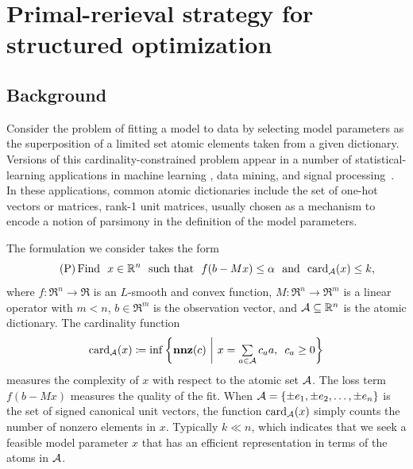 \chapter{Primal-rerieval strategy for structured optimization}
\label{ch:App-Primal-Retrieval}

\section{Background} \label{sec:intro}

Consider the problem of fitting a model to data by selecting model parameters as the superposition of a limited set atomic elements taken from a given dictionary. Versions of this cardinality-constrained problem appear in a number of statistical-learning applications in machine learning \cite{tibshirani1996regression,yul06,Meinshausen06,aep08}, data mining, and signal processing~\cite{candes:2013}. In these applications, common atomic dictionaries include the set of one-hot vectors or matrices, rank-1 unit matrices, usually chosen as a mechanism to encode a notion of parsimony in the definition of the model parameters.

The formulation we consider takes the form
\begin{equation} \label{eq:main_prob} \tag{P}
    \mathop{\hbox{\rm Find}}\enspace x\in\mathbb{R}^n \enspace\mathop{\hbox{\rm such that}}\enspace f(b - Mx) \leq \alpha \enspace\mathop{\hbox{\rm and}}\enspace \operatorname{card}_{\mathcal{A}}(x) \leq k,
\end{equation}
where $f:\Re^n\to\Re$ is an $L$-smooth and convex function, $M: \Re^n \to \Re^m$ is a linear operator with $m < n$, $b \in \Re^m$ is the observation vector, and $\mathcal{A} \subseteq \mathbb{R}^n$ is the atomic dictionary. The cardinality function 
\begin{equation}\label{eq-card-fcn}
    \operatorname{card}_{\mathcal{A}}(x) \coloneqq \inf\left\{ \mathbf{nnz}(c) ~\bigg\vert~ x = \textstyle\sum\limits_{a \in \mathcal{A}} c_a a, \enspace c_a \geq 0\right\}
\end{equation}
measures the complexity of $x$ with respect to the atomic set $\mathcal{A}$.  The loss term $f(b - Mx)$ measures the quality of the fit. When $\mathcal{A} = \{ \pm e_1,\pm e_2, \ldots,\pm e_n \}$ is the set of signed canonical unit vectors, the function $\operatorname{card}_{\mathcal{A}}(x)$ simply counts the number of nonzero elements in $x$. Typically $k\ll n$, which indicates that we seek a feasible model parameter $x$ that has an efficient representation in terms of the atoms in $\mathcal{A}$.

